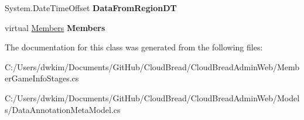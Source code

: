 \begin{DoxyCompactItemize}
\item 
System.\+Date\+Time\+Offset {\bfseries Data\+From\+Region\+DT}\hypertarget{class_cloud_bread_admin_web_1_1_member_game_info_stages_a75b9c7b5861f8bcb52f19991baf1a9e9}{}\label{class_cloud_bread_admin_web_1_1_member_game_info_stages_a75b9c7b5861f8bcb52f19991baf1a9e9}

\item 
virtual \hyperlink{class_cloud_bread_admin_web_1_1_members}{Members} {\bfseries Members}\hypertarget{class_cloud_bread_admin_web_1_1_member_game_info_stages_ac2f90c3f6dc24b7f775cff742d2e286e}{}\label{class_cloud_bread_admin_web_1_1_member_game_info_stages_ac2f90c3f6dc24b7f775cff742d2e286e}

\end{DoxyCompactItemize}


The documentation for this class was generated from the following files\+:\begin{DoxyCompactItemize}
\item 
C\+:/\+Users/dwkim/\+Documents/\+Git\+Hub/\+Cloud\+Bread/\+Cloud\+Bread\+Admin\+Web/Member\+Game\+Info\+Stages.\+cs\item 
C\+:/\+Users/dwkim/\+Documents/\+Git\+Hub/\+Cloud\+Bread/\+Cloud\+Bread\+Admin\+Web/\+Models/Data\+Annotation\+Meta\+Model.\+cs\end{DoxyCompactItemize}
